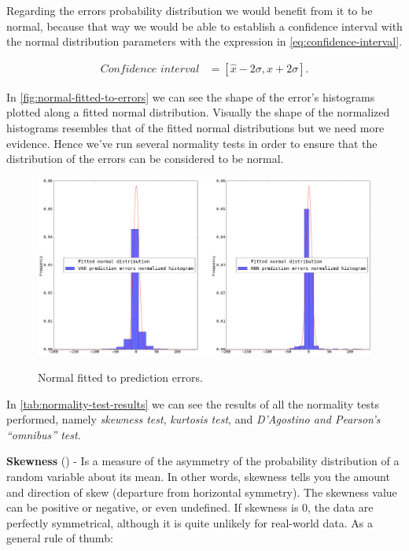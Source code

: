 Regarding the errors probability distribution we would benefit from it
to be normal, because that way we would be able to establish a
confidence interval with the normal distribution parameters with the
expression in \autoref{eq:confidence-interval}.

\begin{equation}
  \begin{aligned}
    \label{eq:confidence-interval}
    \textit{Confidence interval} & =
    [ \hat{x} - 2 \sigma, \hat{x} + 2 \sigma ].
  \end{aligned}
\end{equation}

In \autoref{fig:normal-fitted-to-errors} we can see the shape of the
error's histograms plotted along a fitted normal distribution.
Visually the shape of the normalized histograms resembles that of the
fitted normal distributions but we need more evidence. Hence we've run
several normality tests in order to ensure that the distribution of
the errors can be considered to be normal.

\begin{figure}[bth]
  \myfloatalign
  {
    \includegraphics[width=1\linewidth]
    {gfx/normal-fitted-to-errors}}
  \caption{Normal fitted to prediction errors.}
  \label{fig:normal-fitted-to-errors}
\end{figure}

In \autoref{tab:normality-test-results} we can see the results of all
the normality tests performed, namely \textit{skewness test},
\textit{kurtosis test}, and \textit{D’Agostino and Pearson's
``omnibus'' test}.

\textbf{Skewness} (\cite{d1970transformation}) - Is a measure of the
asymmetry of the probability distribution of a random variable about
its mean. In other words, skewness tells you the amount and direction
of skew (departure from horizontal symmetry). The skewness value can
be positive or negative, or even undefined. If skewness is $0$, the
data are perfectly symmetrical, although it is quite unlikely for
real-world data. As a general rule of thumb:

